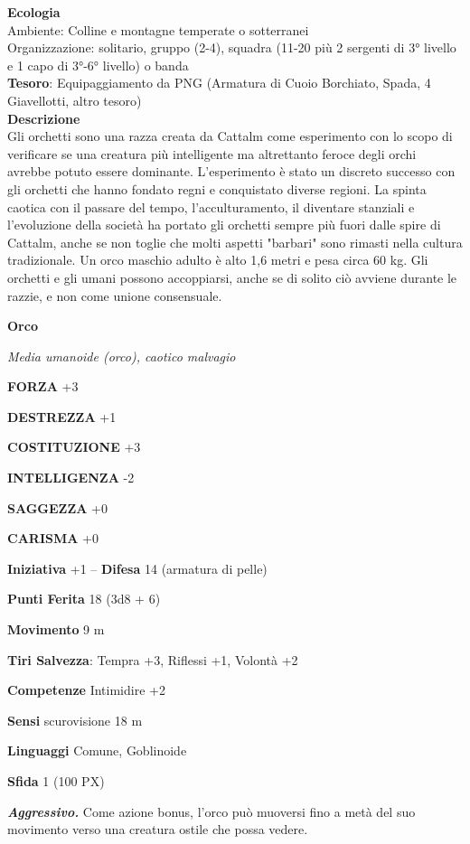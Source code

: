 \begin{multicols}{2}
	\textbf{Ecologia}\\
	Ambiente: Colline e montagne temperate o sotterranei\\
	Organizzazione: solitario, gruppo (2-4), squadra (11-20 più 2 sergenti di 3° livello e 1 capo di 3°-6° livello) o banda \\
	\textbf{Tesoro}: Equipaggiamento da PNG (Armatura di Cuoio Borchiato, Spada, 4 Giavellotti, altro tesoro)\\
	\textbf{Descrizione}\\
	Gli orchetti sono una razza creata da Cattalm come esperimento con lo scopo di verificare se una creatura più intelligente ma altrettanto feroce degli orchi avrebbe potuto essere dominante.
	L'esperimento è stato un discreto successo con gli orchetti che hanno fondato regni e conquistato diverse regioni. La spinta caotica con il passare del tempo, l'acculturamento, il diventare stanziali e l'evoluzione della società ha portato gli orchetti sempre più fuori dalle spire di Cattalm, anche se non toglie che molti aspetti "barbari" sono rimasti nella cultura tradizionale.
	Un orco maschio adulto è alto 1,6 metri e pesa circa 60 kg. Gli orchetti e gli umani possono accoppiarsi, anche se di solito ciò avviene durante le razzie, e non come unione consensuale.

	\medskip{}\textbf{Orco}

	\textit{Media umanoide (orco), caotico malvagio}

	\textbf{FORZA} +3

	\textbf{DESTREZZA} +1

	\textbf{COSTITUZIONE} +3

	\textbf{INTELLIGENZA} -2

	\textbf{SAGGEZZA} +0

	\textbf{CARISMA} +0

	\textbf{Iniziativa} +1 -- \textbf{Difesa} 14 (armatura di pelle)

	\textbf{Punti Ferita} 18 (3d8 + 6)

	\textbf{Movimento} 9 m

	\textbf{Tiri Salvezza}: Tempra +3, Riflessi +1, Volontà +2

	\textbf{Competenze} Intimidire +2

	\textbf{Sensi} scurovisione 18 m

	\textbf{Linguaggi} Comune, Goblinoide

	\textbf{Sfida} 1 (100 PX)

	\textit{\textbf{Aggressivo.}} Come azione bonus, l'orco può muoversi fino a metà del suo movimento verso una creatura ostile che possa vedere.


\end{multicols}
